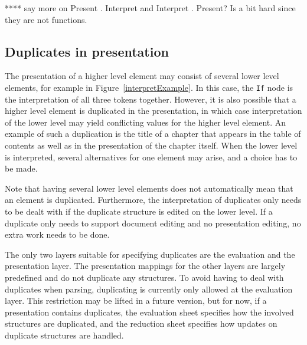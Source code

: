 **** say more on Present . Interpret and Interpret . Present? Is a bit hard since they are not functions.

\fromHere  %

%
%





%																
\subsection{Duplicates in presentation}


The presentation of a higher level element may consist of several lower level elements, for example in Figure~\ref{interpretExample}. In this case, the \verb|If| node is the interpretation of all three tokens together. However, it is also possible that a higher level element is duplicated in the presentation, in which case interpretation of the lower level may yield conflicting values for the higher level element. An example of such a duplication is the title of a chapter that appears in the table of contents as well as in the presentation of the chapter itself. When the lower level is interpreted, several alternatives for one element may arise, and a choice has to be made.

Note that having several lower level elements does not automatically mean that an element is duplicated. Furthermore, the interpretation of duplicates only needs to be dealt with if the duplicate structure is edited on the lower level. If a duplicate only needs to support document editing and no presentation editing, no extra work needs to be done.

The only two layers suitable for specifying duplicates are the evaluation and the presentation layer. The presentation mappings for the other layers are largely predefined and do not duplicate any structures. To avoid having to deal with duplicates when parsing, duplicating is currently only allowed at the evaluation layer. This restriction may be lifted in a future version, but for now, if a presentation contains duplicates, the evaluation sheet specifies how the involved structures are duplicated, and the reduction sheet specifies how updates on duplicate structures are handled.

